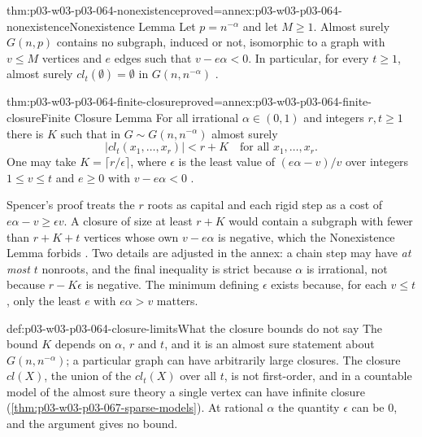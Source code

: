 \begin{hblemma}{thm:p03-w03-p03-064-nonexistence}{proved=annex:p03-w03-p03-064-nonexistence}{Nonexistence Lemma}
Let \(p=n^{-\alpha}\) and let \(M\geq1\).  Almost surely \(G(n,p)\) contains no
subgraph, induced or not, isomorphic to a graph with \(v\leq M\) vertices and
\(e\) edges such that \(v-e\alpha<0\).  In particular, for every \(t\geq1\),
almost surely \(cl_t(\emptyset)=\emptyset\) in \(G(n,n^{-\alpha})\)
\cite[p.~8]{Spencer2007LogicRandomStructuresAuthor}.
\end{hblemma}

\begin{hbtheorem}{thm:p03-w03-p03-064-finite-closure}{proved=annex:p03-w03-p03-064-finite-closure}{Finite Closure Lemma}
For all irrational \(\alpha\in(0,1)\) and integers \(r,t\geq1\) there is
\(K\) such that in \(G\sim G(n,n^{-\alpha})\) almost surely
\[
  |cl_t(x_1,\ldots,x_r)|<r+K\quad\text{for all }x_1,\ldots,x_r.
\]
One may take \(K=\lceil r/\epsilon\rceil\), where \(\epsilon\) is the least
value of \((e\alpha-v)/v\) over integers \(1\leq v\leq t\) and \(e\geq0\) with
\(v-e\alpha<0\) \cite[p.~9]{Spencer2007LogicRandomStructuresAuthor}.
\end{hbtheorem}

Spencer's proof treats the \(r\) roots as capital and each rigid step as a
cost of \(e\alpha-v\geq\epsilon v\).  A closure of size at least \(r+K\) would
contain a subgraph with fewer than \(r+K+t\) vertices whose own \(v-e\alpha\)
is negative, which the Nonexistence Lemma forbids
\cite[p.~9]{Spencer2007LogicRandomStructuresAuthor}.  Two details are
adjusted in the annex: a chain step may have \emph{at most} \(t\) nonroots,
and the final inequality is strict because \(\alpha\) is irrational, not
because \(r-K\epsilon\) is negative.  The minimum defining \(\epsilon\) exists
because, for each \(v\leq t\), only the least \(e\) with \(e\alpha>v\) matters.

\begin{hbwarning}{def:p03-w03-p03-064-closure-limits}{What the closure bounds do not say}
The bound \(K\) depends on \(\alpha\), \(r\) and \(t\), and it is an almost
sure statement about \(G(n,n^{-\alpha})\); a particular graph can have
arbitrarily large closures.  The closure \(cl(X)\), the union of the
\(cl_t(X)\) over all \(t\), is not first-order, and in a countable model of
the almost sure theory a single vertex can have infinite closure
(\cref{thm:p03-w03-p03-067-sparse-models}).  At rational \(\alpha\) the
quantity \(\epsilon\) can be \(0\), and the argument gives no bound.
\end{hbwarning}

